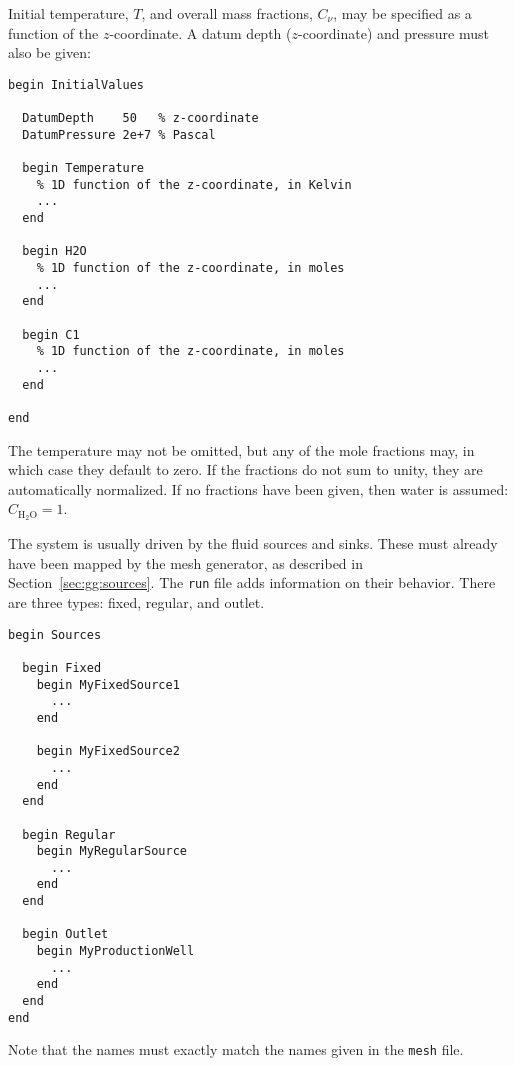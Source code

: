 

Initial temperature, $T$, and overall mass fractions, $C_\nu$, may be
specified as a function of the $z$-coordinate. A datum depth
($z$-coordinate) and pressure must also be given:

\begin{verbatim}
begin InitialValues

  DatumDepth    50   % z-coordinate
  DatumPressure 2e+7 % Pascal

  begin Temperature
    % 1D function of the z-coordinate, in Kelvin
    ...
  end

  begin H2O
    % 1D function of the z-coordinate, in moles
    ...
  end

  begin C1
    % 1D function of the z-coordinate, in moles
    ...
  end

end
\end{verbatim}

The temperature may not be omitted, but any of the mole fractions may,
in which case they default to zero. If the fractions do not sum to
unity, they are automatically normalized. If no fractions have been
given, then water is assumed: $C_{\text{H}_2\text{O}} = 1$.



The system is usually driven by the fluid sources and sinks. These
must already have been mapped by the mesh generator, as described in
Section~\ref{sec:gg:sources}. The \texttt{run} file adds information
on their behavior. There are three types: fixed, regular, and outlet.

\begin{verbatim}
begin Sources

  begin Fixed
    begin MyFixedSource1
      ...
    end

    begin MyFixedSource2
      ...
    end
  end

  begin Regular
    begin MyRegularSource
      ...
    end
  end

  begin Outlet
    begin MyProductionWell
      ...
    end
  end
end
\end{verbatim}

Note that the names must exactly match the names given in the
\texttt{mesh} file.


